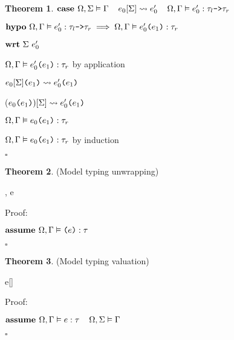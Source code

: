 \documentclass[acmsmall]{acmart}
\theoremstyle{definition}
\newtheorem{theorem}{Theorem}[section]
\begin{document}
\begin{theorem}
  \item \Z $\textbf{case }
    \Omega, \Sigma \vDash \Gamma
    \hspace{4mm}
    e_0[\Sigma] \rightsquigarrow e_0'
    \hspace{4mm}
    \Omega, \Gamma \vDash e_0' : \tau_l \texttt{->} \tau_r
  $
  \item \Z $\B{hypo}\ 
    \Omega, \Gamma \satisfies e_0' \hastype \tau_l \code{->} \tau_r
    \implies
    \Omega, \Gamma \satisfies \code{$e_0'$($e_1$)} \hastype \tau_r
  $
  \item \Z $ 
  \textbf{wrt}\ \Sigma\ e_0' 
  $
  \item \Z\Z $\Omega, \Gamma \vDash e_0'\texttt{(}e_1\texttt{)} : \tau_r$ by application 
  \item \Z\Z $e_0[\Sigma]\texttt{(}e_1\texttt{)} \rightsquigarrow e_0'\texttt{(}e_1\texttt{)}$
  \item \Z\Z ($e_0\texttt{(}e_1\texttt{)})[\Sigma] \rightsquigarrow e_0'\texttt{(}e_1\texttt{)}$
  \item \Z\Z $\Omega, \Gamma \vDash e_0\texttt{(}e_1\texttt{)} : \tau_r$ 

  \item \Z $\Omega, \Gamma \vDash e_0\texttt{(}e_1\texttt{)} : \tau_r$ by induction
  \item $\square$
\end{theorem}

\begin{theorem}(Model typing unwrapping)
  \label{theorem:model_typing_unwrapping}
  \begin{mathpar}
     {
      \Omega, \Gamma \satisfies e \hastype \tau 
    } 
  \end{mathpar}
  Proof:
  \item $\textbf{assume } 
    \Omega, \Gamma \vDash \texttt{($e$)} : \tau 
  $
  \item {}
  \item $\square$
\end{theorem}


\begin{theorem}(Model typing valuation)
  \label{theorem:model_typing_valuation}
  \begin{mathpar}
     {
      \Omega \satisfies e[\Sigma] \hastype \tau 
    } 
  \end{mathpar}
  Proof:
  \item $\textbf{assume } 
    \Omega, \Gamma \vDash e : \tau 
    \hspace{4mm}
    \Omega, \Sigma \vDash \Gamma
  $
  \item {}
  \item $\square$
\end{theorem}
\end{document}
